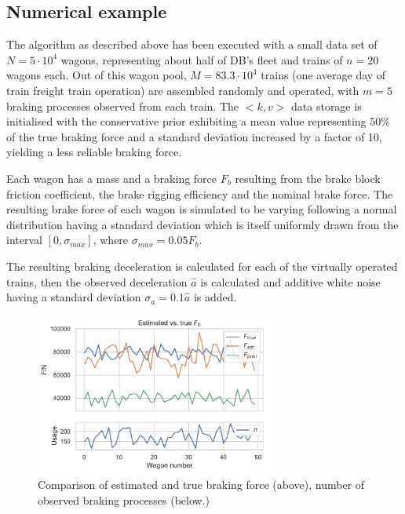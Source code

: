 \documentclass[a4paper, 12pt]{scrartcl}
\begin{document}
\subsection{Numerical example}
The algorithm as described above has been executed with a small data set of $N = 5 \cdot 10^4$ wagons, representing about half of DB's fleet and trains of $n = 20$ wagons each. Out of this wagon pool, $M = 83.3 \cdot 10^4$ trains (one average day of train freight train operation) are assembled randomly and operated, with $m = 5$ braking processes observed from each train. The $<k,v>$ data storage is initialised with the conservative prior exhibiting a mean value representing 50\% of the true braking force and a standard deviation increased by a factor of 10, yielding a less reliable braking force.

Each wagon has a mass and a braking force $F_{b}$ resulting from the brake block friction coefficient, the brake rigging efficiency and the nominal brake force. The resulting brake force of each wagon is simulated to be varying following a normal distribution having a standard deviation which is itself uniformly drawn from the interval $\left[0, \sigma_{max}\right]$, where $\sigma_{max} = 0.05 F_{b}$.

The resulting braking deceleration is calculated for each of the virtually operated trains, then the observed deceleration $\hat{a}$ is calculated and additive white noise having a standard deviation $\sigma_{a} = 0.1\hat{a}$ is added. 

\begin{figure}
\begin{center}
\includegraphics[width = 0.7\textwidth]{190121FleetEstimate}
\caption{Comparison of estimated and true braking force (above), number of observed braking processes (below.)}
\label{Fig:BrakingF}
\end{center}
\end{figure}
\end{document}
